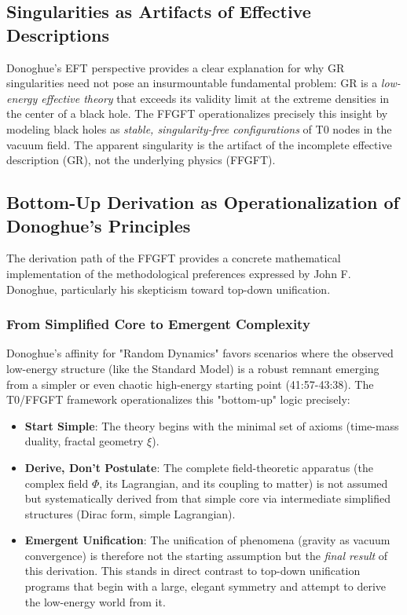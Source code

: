 	\subsection{Singularities as Artifacts of Effective Descriptions}
	
	Donoghue's EFT perspective provides a clear explanation for why GR singularities need not pose an insurmountable fundamental problem: GR is a \emph{low-energy effective theory} that exceeds its validity limit at the extreme densities in the center of a black hole. The FFGFT operationalizes precisely this insight by modeling black holes as \emph{stable, singularity-free configurations} of T0 nodes in the vacuum field. The apparent singularity is the artifact of the incomplete effective description (GR), not the underlying physics (FFGFT).
	
	\subsection{Bottom-Up Derivation as Operationalization of Donoghue's Principles}
	
	The derivation path of the FFGFT provides a concrete mathematical implementation of the methodological preferences expressed by John F. Donoghue, particularly his skepticism toward top-down unification.
	
	\subsubsection{From Simplified Core to Emergent Complexity}
	Donoghue's affinity for "Random Dynamics" favors scenarios where the observed low-energy structure (like the Standard Model) is a robust remnant emerging from a simpler or even chaotic high-energy starting point \cite{DonoghueInterview2025} (41:57-43:38). The T0/FFGFT framework operationalizes this "bottom-up" logic precisely:
	\begin{itemize}
		\item \textbf{Start Simple}: The theory begins with the minimal set of axioms (time-mass duality, fractal geometry \(\xi\)).
		\item \textbf{Derive, Don't Postulate}: The complete field-theoretic apparatus (the complex field \(\Phi\), its Lagrangian, and its coupling to matter) is not assumed but systematically derived from that simple core via intermediate simplified structures (Dirac form, simple Lagrangian).
		\item \textbf{Emergent Unification}: The unification of phenomena (gravity as vacuum convergence) is therefore not the starting assumption but the \emph{final result} of this derivation. This stands in direct contrast to top-down unification programs that begin with a large, elegant symmetry and attempt to derive the low-energy world from it.
	\end{itemize}
	
